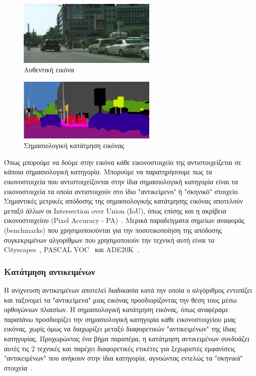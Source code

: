 \documentclass[12pt]{article}
\numberwithin{equation}{section}
\begin{document}
\begin{figure}[h!]
  \centering
  \includegraphics[width=0.60\textwidth]{images/figure0.png} %
  \caption{Αυθεντική εικόνα}
  \label{figure 1}
\end{figure}

\begin{figure}[h!]
  \centering
  \includegraphics[width=0.6\textwidth]{images/figure1.png} %
  \caption{Σημασιολογική κατάτμηση εικόνας}
  \label{figure 2}
\end{figure}

Όπως μπορούμε να δούμε στην εικόνα κάθε εικονοστοιχείο της αντιστοιχείζεται σε κάποια σημασιολογική κατηγορία. Μπορούμε να παρατηρήσουμε πως τα εικονοστοιχεία που αντιστοιχείζονται στην ίδια σημασιολογική κατηγορία είναι τα εικονοστοιχεία τα οποία αντιστοιχούν στο ίδιο "αντικείμενο" ή "σκηνικό" στοιχείο. \\

Σημαντικές μετρικές απόδοσης της σημασιολογικής κατάτμησης εικόνας αποτελούν μεταξύ άλλων οι Intersection over Union (IoU), όπως επίσης και η ακρίβεια εικονοστοιχείου (Pixel Accuracy - PA)~\cite{DBLP:journals/corr/abs-2001-05566}. Μερικά παραδείγματα σημείων αναφοράς (benchmarks) που χρησιμοποιούνται για την ποσοτικοποίηση της απόδοσης συγκεκριμένων αλγορίθμων που χρησιμοποιούν την τεχνική αυτή είναι τα Cityscapes~\cite{DBLP:journals/corr/CordtsORREBFRS16}, PASCAL VOC~\cite{Everingham2010} και ADE20K~\cite{8100027}. \\

\subsubsection{Κατάτμηση αντικειμένων}
Η ανίχνευση αντικειμένων αποτελεί διαδικασία κατά την οποία ο αλγόριθμος εντοπίζει και ταξινομεί τα "αντικείμενα" μιας εικόνας προσδιορίζοντας την θέση τους μέσω ορθογώνιων πλαισίων. Η σημασιολογική κατάτμηση εικόνας, όπως αναφέραμε παραπάνω προσδιορίζει την σημασιολογική κατηγορία κάθε εικονοστοιχείου μιας εικόνας, χωρίς όμως να διαχωρίζει μεταξύ διαφορετικών "αντικειμένων" της ίδιας κατηγορίας. Προχωρώντας ένα βήμα παραπέρα, η κατάτμηση αντικειμένων συνδυάζει αυτές τις 2 τεχνικές και παρέχει διαφορετικές ετικέτες για ξεχωριστές εμφανίσεις "αντικειμένων" που ανήκουν στην ίδια κατηγορία, αγνοώντας εντελώς τα "σκηνικά" στοιχεία~\cite{Hafiz_2020}. \\
\end{document}

